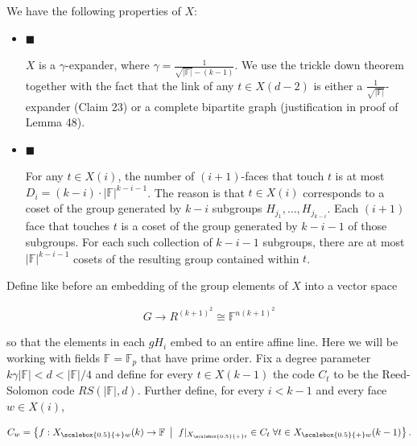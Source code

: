 \documentclass[10pt,a4paper]{article}
\begin{document}
We have the following properties of $X$:\par


\begin{itemize}


\item[] 
$\blacksquare$ 


$X$ is a $\gamma$-expander, where $\gamma=\frac{1}{\sqrt{\lvert\mathbb{F}\rvert}-(k-1)}$. We use the trickle down theorem together with the fact that the link of any $t\in X(d-2)$ is either a $\frac{1}{\sqrt{\lvert\mathbb{F}\rvert}}$-expander (Claim 23) or a complete bipartite graph (justification in proof of Lemma 48).\par





\item[] 
$\blacksquare$ 


For any $t\in X(i)$, the number of $(i+1)$-faces that touch $t$ is at most $D_{i}=(k-i)\cdot|\mathbb{F}|^{k-i-1}$. The reason is that $t\in X(i)$ corresponds to a coset of the group generated by $k-i$ subgroups $H_{j_{1}},\dots,H_{j_{k-i}}$. Each $(i+1)$ face that touches $t$ is a coset of the group generated by $k-i-1$ of those subgroups. For each such collection of $k-i-1$ subgroups, there are at most $|\mathbb{F}|^{k-i-1}$ cosets of the resulting group contained within $t$.\par





\end{itemize}




Define like before an embedding of the group elements of $X$ into a vector space\par


\[\begin{gathered}
G\to R^{(k+1)^{2}}\cong\mathbb{F}^{n(k+1)^{2}}
\end{gathered}\]


so that the elements in each $gH_{i}$ embed to an entire affine line. Here we will be working with fields $\mathbb{F}=\mathbb{F}_{p}$ that have prime order. Fix a degree parameter $k\gamma|\mathbb{F}|<d<\lvert\mathbb{F}\rvert/4$  and define for every $t\in X(k-1)$ the code $C_{t}$ to be the Reed-Solomon code $RS(\lvert\mathbb{F}\rvert,d)$. Further define, for every $i<k-1$ and every face $w\in X(i)$,\par


\[\begin{gathered}
C_{w}=\left\{f:{X}_{\scalebox{0.5}{+}w}(k)\to\mathbb{F}\nobreak\ \left|\;\vphantom{f:{X}_{\scalebox{0.5}{+}w}(k)\to\mathbb{F}\nobreak\ f|_{{X}_{\scalebox{0.5}{+}t}}\in C_{t}\;\forall t\in{X}_{\scalebox{0.5}{+}w}(k-1)}\right.f|_{{X}_{\scalebox{0.5}{+}t}}\in C_{t}\;\forall t\in{X}_{\scalebox{0.5}{+}w}(k-1)\right\}.
\end{gathered}\]
\end{document}
